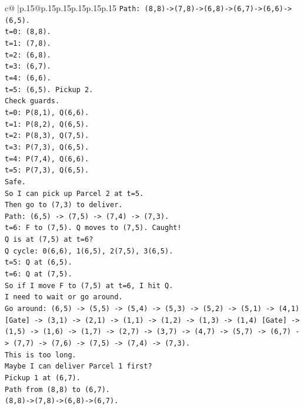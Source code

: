 \documentclass{article}
\begin{document}
{\begin{supertabular}{c@{$\;$}|p{.15\linewidth}@{}p{.15\linewidth}p{.15\linewidth}p{.15\linewidth}p{.15\linewidth}p{.15\linewidth}}
{{{\texttt{Path: (8,8){-}>(7,8){-}>(6,8){-}>(6,7){-}>(6,6){-}>(6,5).} \\
\texttt{t=0: (8,8).} \\
\texttt{t=1: (7,8).} \\
\texttt{t=2: (6,8).} \\
\texttt{t=3: (6,7).} \\
\texttt{t=4: (6,6).} \\
\texttt{t=5: (6,5). Pickup 2.} \\
\texttt{Check guards.} \\
\texttt{t=0: P(8,1), Q(6,6).} \\
\texttt{t=1: P(8,2), Q(6,5).} \\
\texttt{t=2: P(8,3), Q(7,5).} \\
\texttt{t=3: P(7,3), Q(6,5).} \\
\texttt{t=4: P(7,4), Q(6,6).} \\
\texttt{t=5: P(7,3), Q(6,5).} \\
\texttt{Safe.} \\
\texttt{So I can pick up Parcel 2 at t=5.} \\
\texttt{Then go to (7,3) to deliver.} \\
\texttt{Path: (6,5) {-}> (7,5) {-}> (7,4) {-}> (7,3).} \\
\texttt{t=6: F to (7,5). Q moves to (7,5). Caught!} \\
\texttt{Q is at (7,5) at t=6?} \\
\texttt{Q cycle: 0(6,6), 1(6,5), 2(7,5), 3(6,5).} \\
\texttt{t=5: Q at (6,5).} \\
\texttt{t=6: Q at (7,5).} \\
\texttt{So if I move F to (7,5) at t=6, I hit Q.} \\
\texttt{I need to wait or go around.} \\
\texttt{Go around: (6,5) {-}> (5,5) {-}> (5,4) {-}> (5,3) {-}> (5,2) {-}> (5,1) {-}> (4,1) {[}Gate{]} {-}> (3,1) {-}> (2,1) {-}> (1,1) {-}> (1,2) {-}> (1,3) {-}> (1,4) {[}Gate{]} {-}> (1,5) {-}> (1,6) {-}> (1,7) {-}> (2,7) {-}> (3,7) {-}> (4,7) {-}> (5,7) {-}> (6,7) {-}> (7,7) {-}> (7,6) {-}> (7,5) {-}> (7,4) {-}> (7,3).} \\
\texttt{This is too long.} \\
\texttt{Maybe I can deliver Parcel 1 first?} \\
\texttt{Pickup 1 at (6,7).} \\
\texttt{Path from (8,8) to (6,7).} \\
\texttt{(8,8){-}>(7,8){-}>(6,8){-}>(6,7).} \\
}}}
\end{supertabular}}
\end{document}
